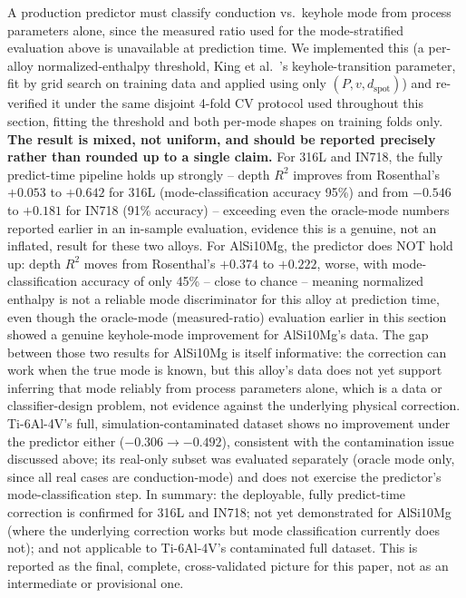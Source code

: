 \documentclass[12pt]{article}
\begin{document}
A production predictor must classify conduction vs.\ keyhole mode from process parameters alone, since the measured ratio used for the mode-stratified evaluation above is unavailable at prediction time. We implemented this (a per-alloy normalized-enthalpy threshold, King et al.\ \cite{king2014}'s keyhole-transition parameter, fit by grid search on training data and applied using only $(P, v, d_{\text{spot}})$) and re-verified it under the same disjoint 4-fold CV protocol used throughout this section, fitting the threshold and both per-mode shapes on training folds only. \textbf{The result is mixed, not uniform, and should be reported precisely rather than rounded up to a single claim.} For 316L and IN718, the fully predict-time pipeline holds up strongly -- depth $R^2$ improves from Rosenthal's $+0.053$ to $+0.642$ for 316L (mode-classification accuracy 95\%) and from $-0.546$ to $+0.181$ for IN718 (91\% accuracy) -- exceeding even the oracle-mode numbers reported earlier in an in-sample evaluation, evidence this is a genuine, not an inflated, result for these two alloys. For AlSi10Mg, the predictor does NOT hold up: depth $R^2$ moves from Rosenthal's $+0.374$ to $+0.222$, worse, with mode-classification accuracy of only 45\% -- close to chance -- meaning normalized enthalpy is not a reliable mode discriminator for this alloy at prediction time, even though the oracle-mode (measured-ratio) evaluation earlier in this section showed a genuine keyhole-mode improvement for AlSi10Mg's data. The gap between those two results for AlSi10Mg is itself informative: the correction can work when the true mode is known, but this alloy's data does not yet support inferring that mode reliably from process parameters alone, which is a data or classifier-design problem, not evidence against the underlying physical correction. Ti-6Al-4V's full, simulation-contaminated dataset shows no improvement under the predictor either ($-0.306\rightarrow-0.492$), consistent with the contamination issue discussed above; its real-only subset was evaluated separately (oracle mode only, since all real cases are conduction-mode) and does not exercise the predictor's mode-classification step. In summary: the deployable, fully predict-time correction is confirmed for 316L and IN718; not yet demonstrated for AlSi10Mg (where the underlying correction works but mode classification currently does not); and not applicable to Ti-6Al-4V's contaminated full dataset. This is reported as the final, complete, cross-validated picture for this paper, not as an intermediate or provisional one.
\end{document}
